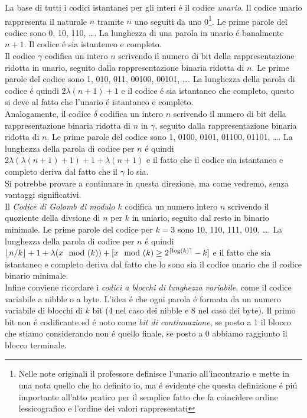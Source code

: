 
\noindent La base di tutti i codici istantanei per gli interi é il codice \textit{unario}. Il codice unario rappresenta il naturale $n$ tramite $n$ uno seguiti da uno 0\footnote{Nelle note originali il professore definisce l'unario all'incontrario e mette in una nota quello che ho definito io, ma é evidente che questa definizione é piú importante all'atto pratico per il semplice fatto che fa coincidere ordine lessicografico e l'ordine dei valori rappresentati}. Le prime parole del codice sono 0, 10, 110, \dots. La lunghezza di una parola in unario é banalmente $n + 1$. Il codice é sia istanteneo e completo.\\
Il codice $\gamma$ %
codifica un intero $n$ scrivendo il numero di bit della rappresentazione ridotta in unario, seguito dalla rappresentazione binaria ridotta di $n$. Le prime parole del codice sono 1, 010, 011, 00100, 00101, \dots. La lunghezza della parola di codice é quindi $2\lambda(n + 1) + 1$ e il codice é sia istantaneo che completo, questo si deve al fatto che l'unario é istantaneo e completo.\\
Analogamente, il codice $\delta$ %
codifica un intero $n$ scrivendo il numero di bit della rappresentazione binaria ridotta di $n$ in $\gamma$, seguito dalla rappresentazione binaria ridotta di $n$. Le prime parole del codice sono 1, 0100, 0101, 01100, 01101, \dots. La lunghezza della parola di codice per $n$ é quindi $2\lambda(\lambda(n + 1) + 1) + 1 + \lambda(n + 1)$ e il fatto che il codice sia istantaneo e completo deriva dal fatto che il $\gamma$ lo sia.\\
Si potrebbe provare a continuare in questa direzione, ma come vedremo, senza vantaggi significativi.\\
Il \textit{Codice di Golomb di modulo $k$} %
codifica un numero intero $n$ scrivendo il quoziente della divsione di $n$ per $k$ in uniario, seguito dal resto in binario minimale. Le prime parole del codice per $k = 3$ sono 10, 110, 111, 010, \dots. La lunghezza della parola di codice per $n$ é quindi $\left\lfloor n/k \right\rfloor + 1 + \lambda(x\mod(k)) + [x\mod(k) \geq 2^{\left\lceil \log(k) \right\rceil} - k]$ e il fatto che sia istantaneo e completo deriva dal fatto che lo sono sia il codice unario che il codice binario minimale.\\
Infine conviene ricordare i \textit{codici a blocchi di lunghezza variabile}, come il codice variabile a nibble o a byte. L'idea é che ogni parola é formata da un numero variabile di blocchi di $k$ bit (4 nel caso dei nibble e 8 nel caso dei byte). Il primo bit non é codificante ed é noto come \textit{bit di continuazione}, se posto a 1 il blocco che stiamo considerando non é quello finale, se posto a 0 abbiamo raggiunto il blocco terminale.\\

